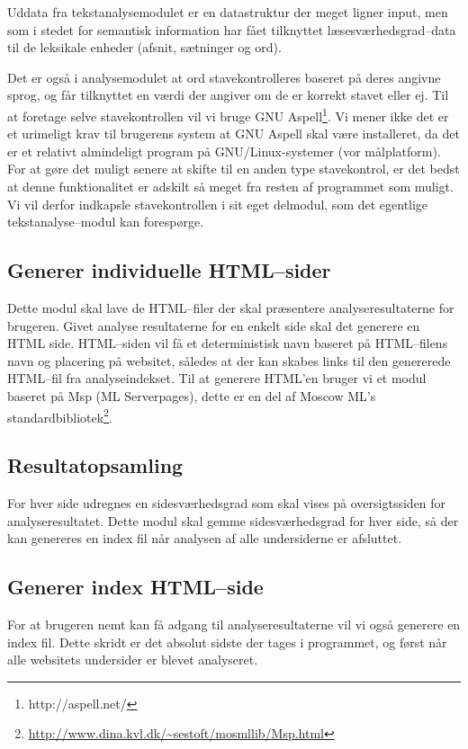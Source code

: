 \documentclass[a4paper,oneside,article]{memoir}
\begin{document}
Uddata fra tekstanalysemodulet er en datastruktur der meget ligner
input, men som i stedet for semantisk information har fået tilknyttet
læsesværhedsgrad--data til de leksikale enheder (afsnit, sætninger og
ord).

Det er også i analysemodulet at ord stavekontrolleres baseret på deres
angivne sprog, og får tilknyttet en værdi der angiver om de er korrekt
stavet eller ej. Til at foretage selve stavekontrollen vil vi bruge
GNU Aspell\footnote{http://aspell.net/}. Vi mener ikke det er et
urimeligt krav til brugerens system at GNU Aspell skal være
installeret, da det er et relativt almindeligt program på
GNU/Linux-systemer (vor målplatform). For at gøre det muligt senere at
skifte til en anden type stavekontrol, er det bedst at denne
funktionalitet er adskilt så meget fra resten af programmet som
muligt. Vi vil derfor indkapsle stavekontrollen i sit eget delmodul,
som det egentlige tekstanalyse--modul kan forespørge.

\subsection{Generer individuelle HTML--sider}
Dette modul skal lave de HTML--filer der skal præsentere
analyseresultaterne for brugeren. Givet analyse resultaterne for en
enkelt side skal det generere en HTML side. HTML--siden vil få et
deterministisk navn baseret på HTML--filens navn og placering på
websitet, således at der kan skabes links til den genererede HTML--fil
fra analyseindekset. Til at generere HTML'en bruger vi et modul
baseret på Msp (ML Serverpages), dette er en del af Moscow ML's
standardbibliotek\footnote{\url{http://www.dina.kvl.dk/~sestoft/mosmllib/Msp.html}}.

\subsection{Resultatopsamling}
For hver side udregnes en sidesværhedsgrad som skal vises på
oversigtssiden for analyseresultatet. Dette modul skal gemme
sidesværhedsgrad for hver side, så der kan genereres en index fil når
analysen af alle undersiderne er afsluttet.

\subsection{Generer index HTML--side}
For at brugeren nemt kan få adgang til analyseresultaterne vil vi også
generere en index fil. Dette skridt er det absolut sidste der tages i
programmet, og først når alle websitets undersider er blevet
analyseret.
\end{document}
